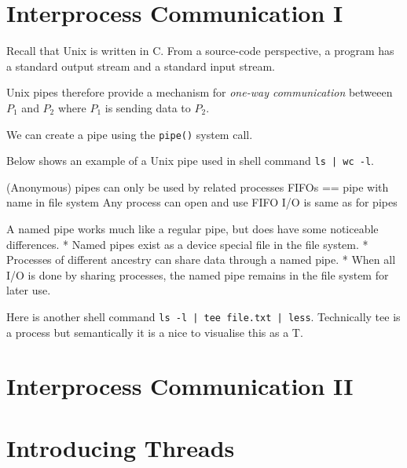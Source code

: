 \section{Interprocess Communication I}



Recall that Unix is written in C. From a source-code perspective, 
a program has a standard output stream and a standard input stream. 


Unix pipes therefore provide a mechanism
for \textit{one-way communication} betweeen $P_1$ and $P_2$ where 
$P_1$ is sending data to $P_2$. 

We can create a pipe using the \lstinline{pipe()} system call.




\begin{example}
Below shows an example of a Unix pipe used in shell command \lstinline{ls | wc -l}.

\begin{figure}[h]
\end{figure} 
\end{example}


(Anonymous) pipes can only be used by related 
processes
FIFOs == pipe with name in file system
Any process can open and use FIFO
I/O is same as for pipes

A named pipe works much like a regular pipe, but does have
some noticeable differences.
* Named pipes exist as a device special file in the file
system.
* Processes of different ancestry can share data through a
named pipe.
* When all I/O is done by sharing processes, the named 
pipe remains in the file system for later use.


\begin{example}
Here is another shell command \lstinline{ls -l | tee file.txt | less}.
Technically tee is a process but semantically it is a nice to
visualise this as a T. 
\end{example}



\section{Interprocess Communication II}

\section{Introducing Threads}